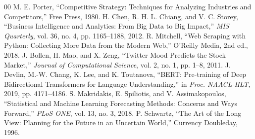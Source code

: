 \documentclass[conference]{IEEEtran}
\begin{document}
\begin{thebibliography}{00}
 M. E. Porter, ``Competitive Strategy: Techniques for Analyzing Industries and Competitors,'' Free Press, 1980.
 H. Chen, R. H. L. Chiang, and V. C. Storey, ``Business Intelligence and Analytics: From Big Data to Big Impact,'' \emph{MIS Quarterly}, vol. 36, no. 4, pp. 1165--1188, 2012.
 R. Mitchell, ``Web Scraping with Python: Collecting More Data from the Modern Web,'' O'Reilly Media, 2nd ed., 2018.
 J. Bollen, H. Mao, and X. Zeng, ``Twitter Mood Predicts the Stock Market,'' \emph{Journal of Computational Science}, vol. 2, no. 1, pp. 1--8, 2011.
 J. Devlin, M.-W. Chang, K. Lee, and K. Toutanova, ``BERT: Pre-training of Deep Bidirectional Transformers for Language Understanding,'' in \emph{Proc. NAACL-HLT}, 2019, pp. 4171--4186.
 S. Makridakis, E. Spiliotis, and V. Assimakopoulos, ``Statistical and Machine Learning Forecasting Methods: Concerns and Ways Forward,'' \emph{PLoS ONE}, vol. 13, no. 3, 2018.
 P. Schwartz, ``The Art of the Long View: Planning for the Future in an Uncertain World,'' Currency Doubleday, 1996.
\end{thebibliography}
\end{document}
